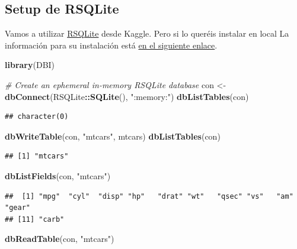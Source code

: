 \documentclass[
]{book}
\newenvironment{Shaded}{\begin{snugshade}}{\end{snugshade}}
\newcommand{\CommentTok}[1]{\textcolor[rgb]{0.56,0.35,0.01}{\textit{#1}}}
\newcommand{\FunctionTok}[1]{\textcolor[rgb]{0.13,0.29,0.53}{\textbf{#1}}}
\newcommand{\NormalTok}[1]{#1}
\newcommand{\OtherTok}[1]{\textcolor[rgb]{0.56,0.35,0.01}{#1}}
\newcommand{\SpecialCharTok}[1]{\textcolor[rgb]{0.81,0.36,0.00}{\textbf{#1}}}
\newcommand{\StringTok}[1]{\textcolor[rgb]{0.31,0.60,0.02}{#1}}
\begin{document}
\subsection{Setup de RSQLite}\label{setup-de-rsqlite}

Vamos a utilizar \href{https://cran.r-project.org/web/packages/RSQLite/index.html}{RSQLite} desde Kaggle. Pero si lo queréis instalar en local La información para su instalación está \href{https://db.rstudio.com/databases/sqlite/}{en el siguiente enlace}.

\begin{Shaded}
\begin{Highlighting}[]
\FunctionTok{library}\NormalTok{(DBI)}

\CommentTok{\# Create an ephemeral in{-}memory RSQLite database}
\NormalTok{con }\OtherTok{\textless{}{-}} \FunctionTok{dbConnect}\NormalTok{(RSQLite}\SpecialCharTok{::}\FunctionTok{SQLite}\NormalTok{(), }\StringTok{":memory:"}\NormalTok{)}
\FunctionTok{dbListTables}\NormalTok{(con)}
\end{Highlighting}
\end{Shaded}

\begin{verbatim}
## character(0)
\end{verbatim}

\begin{Shaded}
\begin{Highlighting}[]
\FunctionTok{dbWriteTable}\NormalTok{(con, }\StringTok{"mtcars"}\NormalTok{, mtcars)}
\FunctionTok{dbListTables}\NormalTok{(con)}
\end{Highlighting}
\end{Shaded}

\begin{verbatim}
## [1] "mtcars"
\end{verbatim}

\begin{Shaded}
\begin{Highlighting}[]
\FunctionTok{dbListFields}\NormalTok{(con, }\StringTok{"mtcars"}\NormalTok{)}
\end{Highlighting}
\end{Shaded}

\begin{verbatim}
##  [1] "mpg"  "cyl"  "disp" "hp"   "drat" "wt"   "qsec" "vs"   "am"   "gear"
## [11] "carb"
\end{verbatim}

\begin{Shaded}
\begin{Highlighting}[]
\FunctionTok{dbReadTable}\NormalTok{(con, }\StringTok{"mtcars"}\NormalTok{)}
\end{Highlighting}
\end{Shaded}
\end{document}
